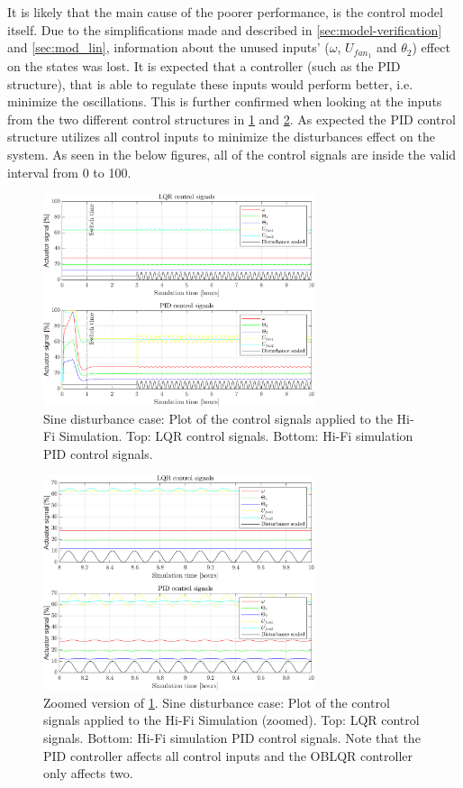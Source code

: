 It is likely that the main cause of the poorer performance, is the control model itself. Due to the simplifications made and described in \cref{sec:model-verification} and \cref{sec:mod_lin}, information about the unused inputs' ($\omega$, $U_{fan_1}$ and $\theta_2$) effect on the states was lost. It is expected that a controller (such as the PID structure), that is able to regulate these inputs would perform better, i.e. minimize the oscillations. This is further confirmed when looking at the inputs from the two different control structures in \cref{fig:inputs_sineDist} and \cref{fig:inputs_sineDist_zoom}. As expected the PID control structure utilizes all control inputs to minimize the disturbances effect on the system. As seen in the below figures, all of the control signals are inside the valid interval from 0 to 100.\\

\begin{figure}[H]
	\centering
	\includegraphics[width=0.71\textwidth]{Graphics/fig_inputs_sineDist.png}
	\caption{Sine disturbance case: Plot of the control signals applied to the Hi-Fi Simulation. Top: LQR control signals. Bottom: Hi-Fi simulation PID control signals.}
	\label{fig:inputs_sineDist}
\end{figure}

\begin{figure}[H]
	\centering
	\includegraphics[width=0.71\textwidth]{Graphics/fig_inputs_sineDist_zoom.png}
	\caption{Zoomed version of \cref{fig:inputs_sineDist}. Sine disturbance case: Plot of the control signals applied to the Hi-Fi Simulation (zoomed). Top: LQR control signals. Bottom: Hi-Fi simulation PID control signals. Note that the PID controller affects all control inputs and the OBLQR controller only affects two.}
	\label{fig:inputs_sineDist_zoom}
\end{figure}

